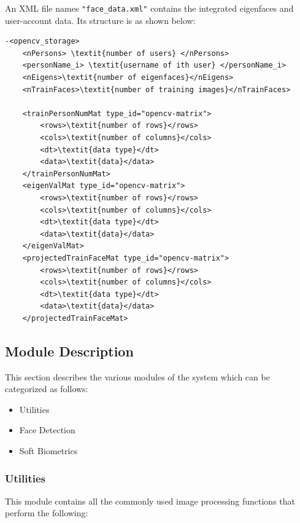 \documentclass[12pt]{article}			%
\begin{document}
An XML file names \verb+"face_data.xml"+ contains the integrated eigenfaces and user-account data. Its structure is as shown below:
\begin{verbatim}
-<opencv_storage>
	<nPersons> \textit{number of users} </nPersons>
	<personName_i> \textit{username of ith user} </personName_i>
	<nEigens>\textit{number of eigenfaces}</nEigens>
	<nTrainFaces>\textit{number of training images}</nTrainFaces>
	
	<trainPersonNumMat type_id="opencv-matrix">
		<rows>\textit{number of rows}</rows>
		<cols>\textit{number of columns}</cols>
		<dt>\textit{data type}</dt>
		<data>\textit{data}</data>
	</trainPersonNumMat>
	<eigenValMat type_id="opencv-matrix">
		<rows>\textit{number of rows}</rows>
		<cols>\textit{number of columns}</cols>
		<dt>\textit{data type}</dt>
		<data>\textit{data}</data>
	</eigenValMat>
	<projectedTrainFaceMat type_id="opencv-matrix">
		<rows>\textit{number of rows}</rows>
		<cols>\textit{number of columns}</cols>
		<dt>\textit{data type}</dt>
		<data>\textit{data}</data>
	</projectedTrainFaceMat>
\end{verbatim}

\subsection{ Module Description }
This section describes the various modules of the system which can be categorized as follows:
\begin{itemize}
\item Utilities
\item Face Detection
\item Soft Biometrics
\end{itemize}

\subsubsection { Utilities }
This module contains all the commonly used image processing functions that perform the following:
\end{document}
